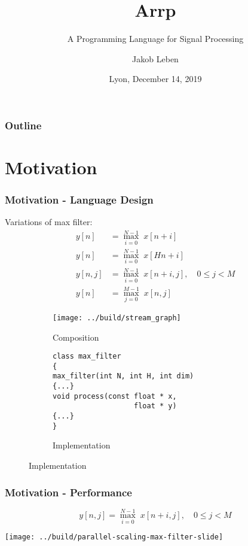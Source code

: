 \documentclass{beamer}
\title{Arrp}
\subtitle{A Programming Language for Signal Processing}
\author{Jakob Leben}
\institute{Limbic Media, Victoria, Canada}
\date{Lyon, December 14, 2019}
\begin{document}
\begin{frame}
\titlepage
\end{frame}

\begin{frame}
\frametitle{Outline}
\tableofcontents
\end{frame}

\section{Motivation}

\begin{frame}[fragile]
\frametitle{Motivation - Language Design}

Variations of max filter:
{
\footnotesize
\begin{align}
\label{eq:max-filter}
    y[n] &= \max_{i = 0}^{N-1} \; x[n+i] \\
    y[n] &= \max_{i = 0}^{N-1} \; x[Hn+i] \\
    y[n, j] &= \max_{i = 0}^{N-1} \; x[n+i, j], \quad 0 \leq j < M \\
    y[n] &= \max_{j = 0}^{M-1} \; x[n, j]
\end{align}
}

\vspace{-3em}
\begin{figure}
\begin{subfigure}[t]{0.4\textwidth}
    \caption{Composition}
    \texttt{[image: ../build/stream\_graph]}
\end{subfigure}
\hspace{0.5cm}
\begin{subfigure}[t]{0.4\textwidth}
\caption{Implementation}
\footnotesize
\vspace{-1em}
\begin{verbatim}
class max_filter
{
max_filter(int N, int H, int dim)
{...}
void process(const float * x,
                   float * y)
{...}
}
\end{verbatim}
\end{subfigure}

\end{figure}

\end{frame}


\begin{frame}[fragile]
\frametitle{Motivation - Performance}

\[y[n, j] = \max_{i = 0}^{N-1} \; x[n+i, j], \quad 0 \leq j < M\]

\centering
\texttt{[image: ../build/parallel-scaling-max-filter-slide]}

\end{frame}
\end{document}
